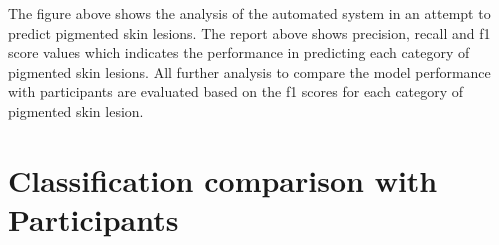 The figure above shows the analysis of the automated system in an attempt to predict pigmented skin lesions. The report above shows precision, recall and f1 score values which indicates the performance in predicting each category of pigmented skin lesions. All further analysis to compare the model performance with participants are evaluated based on the f1 scores for each category of pigmented skin lesion.


\pagebreak

\section{Classification comparison with Participants}
